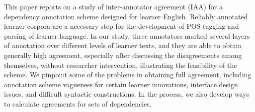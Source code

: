 This paper reports on a study of inter-annotator agreement (IAA) for a dependency annotation scheme designed for learner English. Reliably annotated
 learner corpora are a necessary step for the development of POS tagging and
 parsing of learner language. In our study, three  annotators marked
 several layers of annotation over different levels of learner texts, and they
 are able to obtain generally high agreement, especially after discussing the
 disagreements among themselves, without researcher intervention, illustrating
 the feasibility of the scheme. We pinpoint some of the problems in obtaining
 full agreement, including annotation scheme vagueness for certain learner
 innovations, interface design issues, and difficult syntactic constructions. In
 the process, we also develop ways to calculate agreements for sets of
 dependencies.


